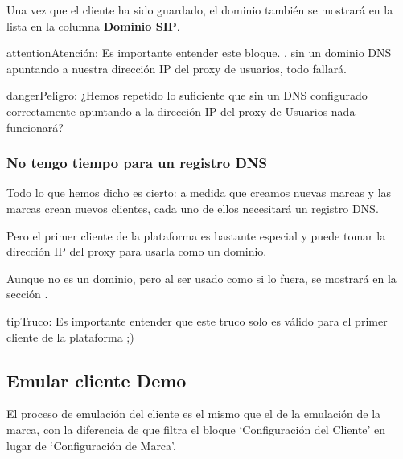 \documentclass[letterpaper,10pt,spanish]{sphinxmanual}
\begin{document}
Una vez que el cliente ha sido guardado, el dominio también se mostrará en la lista en la columna \textbf{Dominio SIP}.

\begin{notice}{attention}{Atención:}
Es importante entender este bloque. {\hyperref[getting_started/internal_calls/brand_portal:dnshack]{}}, sin un dominio DNS apuntando a nuestra dirección IP del proxy de usuarios, todo fallará.
\end{notice}

\begin{notice}{danger}{Peligro:}
¿Hemos repetido lo suficiente que sin un DNS configurado correctamente apuntando a la dirección IP del proxy de Usuarios nada funcionará?
\end{notice}


\subsubsection{No tengo tiempo para un registro DNS}
\label{getting_started/internal_calls/brand_portal:dnshack}\label{getting_started/internal_calls/brand_portal:i-have-no-time-for-a-dns-registry}
Todo lo que hemos dicho es cierto: a medida que creamos nuevas marcas y las marcas crean nuevos clientes, cada uno de ellos necesitará un registro DNS.

Pero el primer cliente de la plataforma es bastante especial y puede tomar la dirección IP del proxy para usarla como un dominio.

Aunque no es un dominio, pero al ser usado como si lo fuera, se mostrará en la sección {\hyperref[administration_portal/platform/sip_domains:sip\string-domains]{}}.

\begin{notice}{tip}{Truco:}
Es importante entender que este truco solo es válido para el primer cliente de la plataforma ;)
\end{notice}


\subsection{Emular cliente Demo}
\label{getting_started/internal_calls/brand_portal:emulate-client}\label{getting_started/internal_calls/brand_portal:emulate-demo-client}
El proceso de emulación del cliente es el mismo que el de la emulación de la marca, con la diferencia de que filtra el bloque ‘Configuración del Cliente’ en lugar de ‘Configuración de Marca’.
\end{document}

